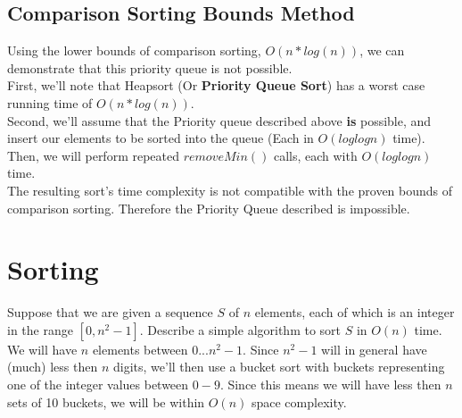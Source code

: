 \documentclass[12pt]{article}
\begin{document}
\subsection{Comparison Sorting Bounds Method}
Using the lower bounds of comparison sorting, $O(n*log(n))$, we can demonstrate that this priority queue is not possible.\\ First, we'll note that Heapsort (Or {\bf Priority Queue Sort}) has a worst case running time of $O(n*log(n))$.\\
Second, we'll assume that the Priority queue described above {\bf is} possible, and insert our elements to be sorted into the queue (Each in $O(log log n)$ time). Then, we will perform repeated $removeMin()$ calls, each with $O(log log n)$ time. \\
The resulting sort's time complexity is not compatible with the proven bounds of comparison sorting. Therefore the Priority Queue described is impossible.

\section{Sorting}
Suppose that we are given a sequence $S$ of $n$ elements, each of which is an integer in the range $[0,n^2-1]$. Describe a simple algorithm to sort $S$ in $O(n)$ time.
\linebreak
\linebreak
We will have $n$ elements between $0...n^2-1$. Since $n^2-1$ will in general have (much) less then $n$ digits, we'll then use a bucket sort with buckets representing one of the integer values between $0-9$. Since this means we will have less then $n$ sets of 10 buckets, we will be within $O(n)$ space complexity.
\end{document}
